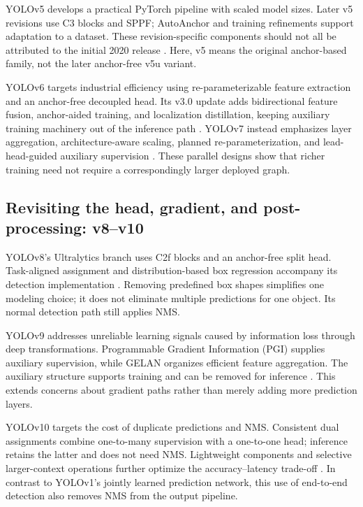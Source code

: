 \documentclass[11pt,a4paper]{article}
\begin{document}
YOLOv5 develops a practical PyTorch pipeline with scaled model sizes. Later v5 revisions use C3 blocks and SPPF; AutoAnchor and training refinements support adaptation to a dataset. These revision-specific components should not all be attributed to the initial 2020 release \cite{ultralytics2020yolov5,yolov5architecture}. Here, v5 means the original anchor-based family, not the later anchor-free v5u variant.

YOLOv6 targets industrial efficiency using re-parameterizable feature extraction and an anchor-free decoupled head. Its v3.0 update adds bidirectional feature fusion, anchor-aided training, and localization distillation, keeping auxiliary training machinery out of the inference path \cite{li2022yolov6,li2023yolov6}. YOLOv7 instead emphasizes layer aggregation, architecture-aware scaling, planned re-parameterization, and lead-head-guided auxiliary supervision \cite{wang2023yolov7}. These parallel designs show that richer training need not require a correspondingly larger deployed graph.

\subsection{Revisiting the head, gradient, and post-processing: v8--v10}
YOLOv8's Ultralytics branch uses C2f blocks and an anchor-free split head. Task-aligned assignment and distribution-based box regression accompany its detection implementation \cite{ultralytics2023yolov8,ultralyticscode}. Removing predefined box shapes simplifies one modeling choice; it does not eliminate multiple predictions for one object. Its normal detection path still applies NMS.

YOLOv9 addresses unreliable learning signals caused by information loss through deep transformations. Programmable Gradient Information (PGI) supplies auxiliary supervision, while GELAN organizes efficient feature aggregation. The auxiliary structure supports training and can be removed for inference \cite{wang2024yolov9}. This extends concerns about gradient paths rather than merely adding more prediction layers.

YOLOv10 targets the cost of duplicate predictions and NMS. Consistent dual assignments combine one-to-many supervision with a one-to-one head; inference retains the latter and does not need NMS. Lightweight components and selective larger-context operations further optimize the accuracy--latency trade-off \cite{wang2024yolov10}. In contrast to YOLOv1's jointly learned prediction network, this use of end-to-end detection also removes NMS from the output pipeline.
\end{document}

